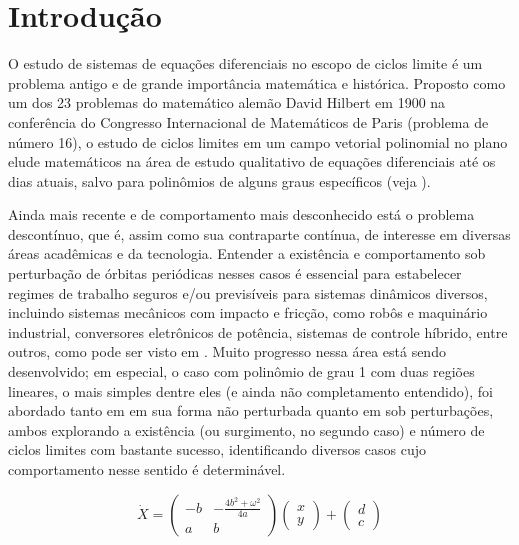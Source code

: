 \clearpage

\tableofcontents

\clearpage

\section{Introdução}
O estudo de sistemas de equações diferenciais no escopo de ciclos limite é um problema antigo e de grande importância matemática e histórica. Proposto como um dos 23 problemas do matemático alemão David Hilbert em 1900 na conferência do Congresso Internacional de Matemáticos de Paris (problema de número 16), o estudo de ciclos limites em um campo vetorial polinomial no plano elude matemáticos na área de estudo qualitativo de equações diferenciais até os dias atuais, salvo para polinômios de alguns graus específicos  (veja \cite{JLi}). 

Ainda mais recente e de comportamento mais desconhecido está o problema descontínuo, que é, assim como sua contraparte contínua, de interesse em diversas áreas acadêmicas e da tecnologia. Entender a existência e comportamento sob perturbação de órbitas periódicas nesses casos é essencial para estabelecer regimes de trabalho seguros e/ou previsíveis para sistemas dinâmicos diversos, incluindo sistemas mecânicos com impacto e fricção, como robôs e maquinário industrial, conversores eletrônicos de potência, sistemas de controle híbrido, entre outros, como pode ser visto em \cite{bernardoetal}. Muito progresso nessa área está sendo desenvolvido; em especial, o caso com polinômio de grau 1 com duas regiões lineares, o mais simples dentre eles (e ainda não completamento entendido), foi abordado tanto em \cite{Huan:etal:2012} em sua forma não perturbada quanto em \cite{HAN20102399} sob perturbações, ambos explorando a existência (ou surgimento, no segundo caso) e número de ciclos limites com bastante sucesso, identificando diversos casos cujo comportamento nesse sentido é determinável.

$$
\dot{X}=\left(\begin{array}{cc}
-b & -\frac{4b^{2}+\omega^{2}}{4a} \\
a & b
\end{array}\right)\left(\begin{array}{l}
x \\
y
\end{array}\right)+\left(\begin{array}{l}
d \\
c
\end{array}\right)
$$

